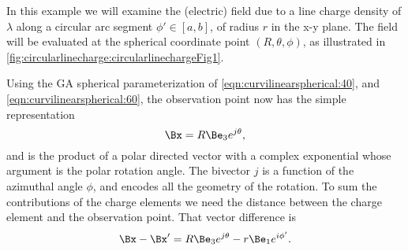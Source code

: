 %
%
In this example we will examine the (electric) field due to a line charge density of \( \lambda \) along a circular arc segment \( \phi' \in [a,b] \), of radius \( r \) in the x-y plane.
The field will be evaluated at the
spherical coordinate point \( (R, \theta, \phi) \), as illustrated in \cref{fig:circularlinecharge:circularlinechargeFig1}.


Using the GA spherical parameterization of \cref{eqn:curvilinearspherical:40}, and \cref{eqn:curvilinearspherical:60}, the
%
%
%
%
observation point now has the simple representation
\begin{equation}\label{eqn:circularlinecharge:60}
\Bx = R \Be_3 e^{j \theta },
\end{equation}
and is the product of a polar directed vector with a complex exponential whose argument is the polar rotation angle.
The bivector \( j \) is a function of the azimuthal angle \( \phi \), and encodes all the geometry of the rotation.
To sum the contributions of the charge elements we need the distance between the charge element and the observation point.
That vector difference is
\begin{dmath}\label{eqn:circularlinecharge:80}
\Bx - \Bx'
=
R \Be_3 e^{j \theta } - r \Be_1 e^{i \phi'}.
\end{dmath}


